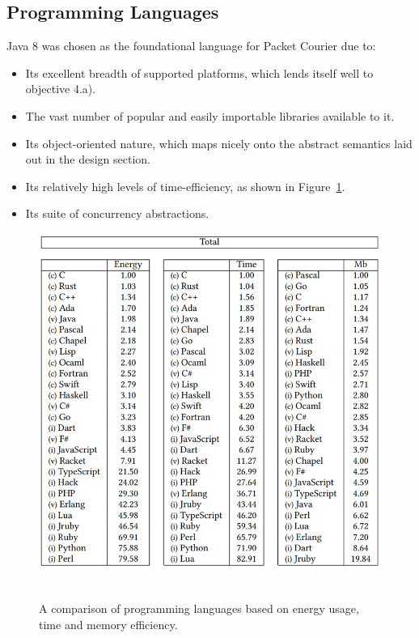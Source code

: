 \newpage

\subsection{Programming Languages}\label{subsection:programming_languages}

Java 8\cite{java_8} was chosen as the foundational language for Packet Courier due to:
\begin{itemize}
    \item Its excellent breadth of supported platforms\cite{java_8_support}, which lends itself well to objective 4.a).
    \item The vast number of popular and easily importable libraries available to it\cite{java_relevance}.
    \item Its object-oriented nature, which maps nicely onto the abstract semantics laid out in the design section.
    \item Its relatively high levels of time-efficiency, as shown in
    Figure~\ref{fig:chapter_4_implementation-programming_language_comparison}.
    \item Its suite of concurrency abstractions\cite{java_util_concurrent}.
\end{itemize}

\begin{figure}[!h]
    \includegraphics[width=\textwidth]{images/chapter_4_implementation/programming_language_comparison}
    \centering~\caption{A comparison of programming languages based on energy usage, time and memory
    efficiency\cite{programming_language_efficiency}.}
    \label{fig:chapter_4_implementation-programming_language_comparison}
\end{figure}

